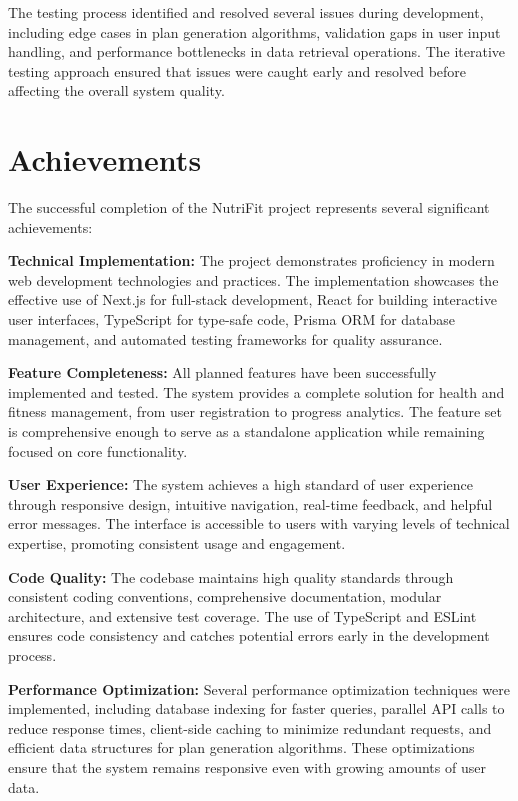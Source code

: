 The testing process identified and resolved several issues during development, including edge cases in plan generation algorithms, validation gaps in user input handling, and performance bottlenecks in data retrieval operations. The iterative testing approach ensured that issues were caught early and resolved before affecting the overall system quality.

\section{Achievements}

The successful completion of the NutriFit project represents several significant achievements:

\textbf{Technical Implementation:} The project demonstrates proficiency in modern web development technologies and practices. The implementation showcases the effective use of Next.js for full-stack development, React for building interactive user interfaces, TypeScript for type-safe code, Prisma ORM for database management, and automated testing frameworks for quality assurance.

\textbf{Feature Completeness:} All planned features have been successfully implemented and tested. The system provides a complete solution for health and fitness management, from user registration to progress analytics. The feature set is comprehensive enough to serve as a standalone application while remaining focused on core functionality.

\textbf{User Experience:} The system achieves a high standard of user experience through responsive design, intuitive navigation, real-time feedback, and helpful error messages. The interface is accessible to users with varying levels of technical expertise, promoting consistent usage and engagement.

\textbf{Code Quality:} The codebase maintains high quality standards through consistent coding conventions, comprehensive documentation, modular architecture, and extensive test coverage. The use of TypeScript and ESLint ensures code consistency and catches potential errors early in the development process.

\textbf{Performance Optimization:} Several performance optimization techniques were implemented, including database indexing for faster queries, parallel API calls to reduce response times, client-side caching to minimize redundant requests, and efficient data structures for plan generation algorithms. These optimizations ensure that the system remains responsive even with growing amounts of user data.

